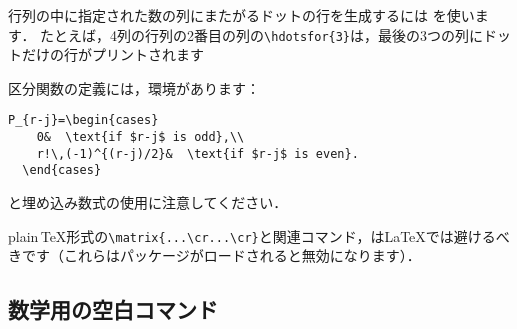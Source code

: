 行列の中に指定された数の列にまたがるドットの行を生成するには を使います．
たとえば，4列の行列の2番目の列の\verb'\hdotsfor{3}'は，最後の3つの列にドットだけの行がプリントされます

区分関数の定義には，環境があります：
\begin{verbatim}
P_{r-j}=\begin{cases}
    0&  \text{if $r-j$ is odd},\\
    r!\,(-1)^{(r-j)/2}&  \text{if $r-j$ is even}.
  \end{cases}
\end{verbatim}
と埋め込み数式の使用に注意してください．

\begin{notes}
\singlenote plain\,\TeX{}形式の\verb'\matrix{...\cr...\cr}'と関連コマンド，は\LaTeX{}では避けるべきです（これらはパッケージがロードされると無効になります）．
\end{notes}

\subsection{数学用の空白コマンド}

